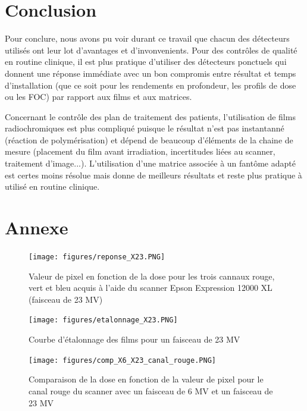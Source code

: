 \documentclass{book}
\begin{document}
\chapter{Conclusion}

Pour conclure, nous avons pu voir durant ce travail que chacun des détecteurs utilisés ont leur lot d'avantages et d'invonvenients. Pour des contrôles de qualité en routine clinique, il est plus pratique d'utiliser des détecteurs ponctuels qui donnent une réponse immédiate avec un bon compromis entre résultat et temps d'installation (que ce soit pour les rendements en profondeur, les profils de dose ou les FOC) par rapport aux films et aux matrices.

Concernant le contrôle des plan de traitement des patients, l'utilisation de films radiochromiques est plus compliqué puisque le résultat n'est pas instantanné (réaction de polymérisation) et dépend de beaucoup d'éléments de la chaine de mesure (placement du film avant irradiation, incertitudes liées au scanner, traitement d'image...). L'utilisation d'une matrice associée à un fantôme adapté est certes moins résolue mais donne de meilleurs résultats et reste plus pratique à utilisé en routine clinique.

\chapter{Annexe}

\begin{figure}[h]
  \centering
  \texttt{[image: figures/reponse\_X23.PNG]}
  \caption{Valeur de pixel en fonction de la dose pour les trois cannaux rouge, vert et bleu acquis à l'aide du scanner Epson Expression 12000 XL (faisceau de 23 MV)}
  \label{fig_reponse_scanner_X23}
\end{figure}

\begin{figure}[h]
  \centering
  \texttt{[image: figures/etalonnage\_X23.PNG]}
  \caption{Courbe d'étalonnage des films pour un faisceau de 23 MV}
  \label{fig_courbe_etalonnage_X23}
\end{figure}

\begin{figure}[h]
  \centering
  \texttt{[image: figures/comp\_X6\_X23\_canal\_rouge.PNG]}
  \caption{Comparaison de la dose en fonction de la valeur de pixel pour le canal rouge du scanner avec un faisceau de 6 MV et un faisceau de 23 MV}
  \label{fig_comp_canal_rouge}
\end{figure}
\end{document}
